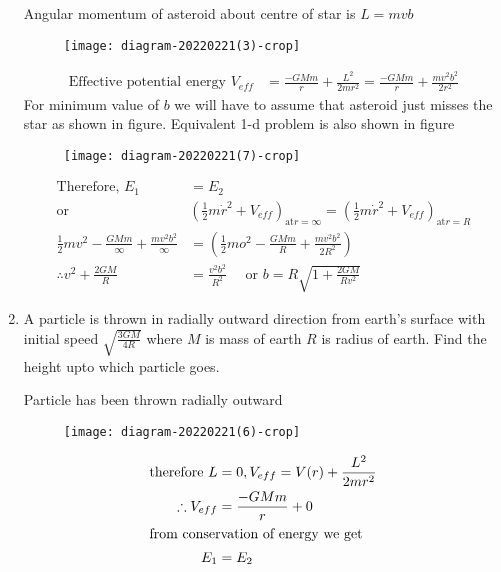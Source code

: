 \begin{enumerate}
	\begin{answer}
		Angular momentum of asteroid about centre of star is $L=m v b$
		\begin{figure}[H]
			\centering
			\texttt{[image: diagram-20220221(3)-crop]}
		\end{figure}
		\begin{align*}
		\text{Effective potential energy }V_{e f f}&=\frac{-G M m}{r}+\frac{L^{2}}{2 m r^{2}}=\frac{-G M m}{r}+\frac{m v^{2} b^{2}}{2 r^{2}}
		\end{align*}
		For minimum value of $b$ we will have to assume that asteroid just misses the star as shown in figure. Equivalent 1-d problem is also shown in figure
		\begin{figure}[H]
			\centering
			\texttt{[image: diagram-20220221(7)-crop]}
		\end{figure}
		\begin{align*}
		\text{Therefore, }E_{1}&=E_{2}\\
		\text{or }&\left(\frac{1}{2} m \dot{r}^{2}+V_{e f f}\right)_{\mathrm{at} r=\infty}=\left(\frac{1}{2} m \dot{r}^{2}+V_{e f f}\right)_{\mathrm{at} r=R}\\
		\frac{1}{2} m v^{2}-\frac{G M m}{\infty}+\frac{m v^{2} b^{2}}{\infty}&=\left(\frac{1}{2} m o^{2}-\frac{G M m}{R}+\frac{m v^{2} b^{2}}{2 R^{2}}\right)\\
		\therefore v^{2}+\frac{2 G M}{R}&=\frac{v^{2} b^{2}}{R^{2}} \quad \text { or } b=R \sqrt{1+\frac{2 G M}{R v^{2}}}
		\end{align*}
	\end{answer}
	\item  A particle is thrown in radially outward direction from earth's surface with initial speed $\sqrt{\frac{3 G M}{4 R}}$ where $M$ is mass of earth $R$ is radius of earth. Find the height upto which particle goes.
	\begin{answer}
		Particle has been thrown radially outward 
		\begin{figure}[H]
			\centering
			\texttt{[image: diagram-20220221(6)-crop]}
		\end{figure}
		\begin{align*}
		\text{therefore }L&=0, V_{e f f}=V(r)+\frac{L^{2}}{2 m r^{2}}\\
		\therefore V_{e f f}&=\frac{-G M m}{r}+0\\
		\intertext{from conservation of energy we get }E_{1}&=E_{2}\\

\end{align*}
\end{answer}
\end{enumerate}
